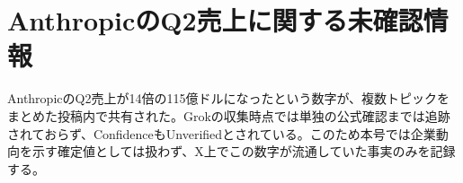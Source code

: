 \section{AnthropicのQ2売上に関する未確認情報}
AnthropicのQ2売上が14倍の115億ドルになったという数字が、複数トピックをまとめた投稿内で共有された。Grokの収集時点では単独の公式確認までは追跡されておらず、ConfidenceもUnverifiedとされている。このため本号では企業動向を示す確定値としては扱わず、X上でこの数字が流通していた事実のみを記録する。
